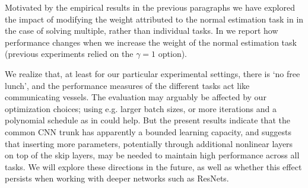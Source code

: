 \documentclass[10pt,twocolumn,letterpaper]{article}
\begin{document}
Motivated by the empirical results in the previous paragraphs we have explored the impact of modifying the weight attributed to  the normal estimation task in  in the case of solving multiple, rather than individual tasks. 
In  we report how performance changes when we increase the weight of the normal estimation task  (previous experiments  relied on the $\gamma=1$ option). 

We realize that, at least for our particular experimental settings, there is `no free lunch', and the performance measures of the different tasks  act like communicating vessels.
 The evaluation may arguably be affected by our optimization choices; using e.g. larger batch sizes, or more iterations and a polynomial schedule as in \cite{ChenPK0Y16} could help. But the present results  indicate  that the common CNN trunk has apparently a bounded learning capacity, and suggests that inserting more parameters, potentially through additional nonlinear layers on top of the skip layers, may be needed to maintain high performance across all tasks. We will explore these directions in the future, as well as whether this effect persists when working with deeper networks such as ResNets.





\end{document}
